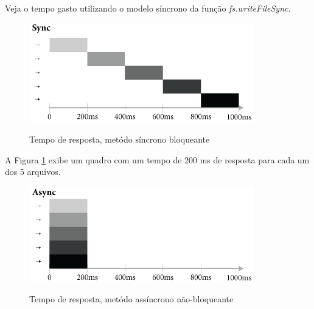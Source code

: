   Veja o tempo gasto utilizando o modelo síncrono da função \textit{fs.writeFileSync}.
  
  \begin{figure}[H]
  \setlength{\abovecaptionskip}{0pt}
  \setlength{\belowcaptionskip}{0pt}
  \caption[Tempo de resposta, metódo síncrono bloqueante]{Tempo de resposta, metódo síncrono bloqueante}
  \centering
  \includegraphics[width=.85\textwidth]{imagem/timeline-node-sync-caio-ribeiro.png}
  \captionsetup{justification=centering}
  \label{fig:timeline-sync}
  \end{figure}
  
  A Figura \ref{fig:timeline-sync} exibe um quadro com um tempo de 200 ms de resposta para cada um dos 5 arquivos.

  \begin{figure}[H]
  \setlength{\abovecaptionskip}{0pt}
  \setlength{\belowcaptionskip}{0pt}
  \caption[Tempo de resposta, metódo assíncrono não-bloqueante]{Tempo de resposta, metódo assíncrono não-bloqueante}
  \centering
  \includegraphics[width=.85\textwidth]{imagem/timeline-node-async-caio-ribeiro.png}
  \captionsetup{justification=centering}
  \label{fig:timeline-async}
  \end{figure}

